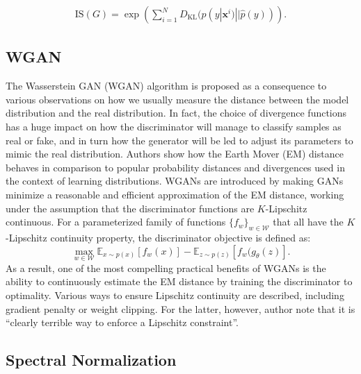 \begin{equation}
\label{eq_IS2}
\begin{split}
\text{IS}(G) = \exp\left(\sum^N_{i=1}D_{\mathrm{KL}}(p(y|\bm{x}^i)||\hat{p}(y))\right).
\end{split}
\end{equation}


\subsection{WGAN}
The Wasserstein GAN (WGAN) algorithm is proposed as a consequence to various  observations on how we usually measure the distance between the model distribution and the real distribution. In fact, the choice of divergence functions has a huge impact on how the discriminator will manage to classify samples as real or fake, and in turn how the generator will be led to adjust its parameters to mimic the real distribution. Authors show how the Earth Mover (EM) distance behaves in comparison to popular probability distances and divergences used in the context of learning distributions. WGANs are introduced by making GANs minimize a reasonable and efficient approximation of the EM distance, working under the assumption that the discriminator functions are $K$-Lipschitz continuous. For a parameterized family of functions $\{ f_w \}_{w \in \mathcal{W}}$ that all have the $K$-Lipschitz continuity property, the discriminator objective is defined as:
\begin{equation} \label{eq:wgan}
\max_{w \in \mathcal{W}} \mathbb{E}_{x \sim p(x)}[f_w(x)] -
\mathbb{E}_{z \sim p(z)} [f_w(g_\theta (z)].
\end{equation}
As a result, one of the most compelling practical benefits of WGANs is the ability to continuously estimate the EM distance by training the discriminator to optimality. Various ways to ensure Lipschitz continuity are described, including gradient penalty or weight clipping. For the latter, however, author note that it is ``clearly terrible way to enforce a Lipschitz constraint''.

\subsection{Spectral Normalization}
\label{sec:bg-sn}

